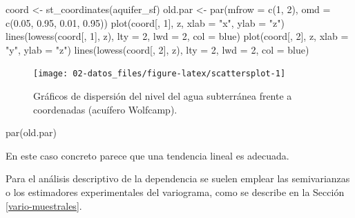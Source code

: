 \documentclass[
  spanish,
]{book}
\newenvironment{Shaded}{\begin{snugshade}}{\end{snugshade}}
\newcommand{\AttributeTok}[1]{\textcolor[rgb]{0.77,0.63,0.00}{#1}}
\newcommand{\DecValTok}[1]{\textcolor[rgb]{0.00,0.00,0.81}{#1}}
\newcommand{\FloatTok}[1]{\textcolor[rgb]{0.00,0.00,0.81}{#1}}
\newcommand{\FunctionTok}[1]{\textcolor[rgb]{0.00,0.00,0.00}{#1}}
\newcommand{\NormalTok}[1]{#1}
\newcommand{\OtherTok}[1]{\textcolor[rgb]{0.56,0.35,0.01}{#1}}
\newcommand{\StringTok}[1]{\textcolor[rgb]{0.31,0.60,0.02}{#1}}
\theoremstyle{break}
\begin{document}
\begin{Shaded}
\begin{Highlighting}[]
\NormalTok{coord }\OtherTok{\textless{}{-}} \FunctionTok{st\_coordinates}\NormalTok{(aquifer\_sf)}
\NormalTok{old.par }\OtherTok{\textless{}{-}} \FunctionTok{par}\NormalTok{(}\AttributeTok{mfrow =} \FunctionTok{c}\NormalTok{(}\DecValTok{1}\NormalTok{, }\DecValTok{2}\NormalTok{), }\AttributeTok{omd =} \FunctionTok{c}\NormalTok{(}\FloatTok{0.05}\NormalTok{, }\FloatTok{0.95}\NormalTok{, }\FloatTok{0.01}\NormalTok{, }\FloatTok{0.95}\NormalTok{))}
\FunctionTok{plot}\NormalTok{(coord[, }\DecValTok{1}\NormalTok{], z, }\AttributeTok{xlab =} \StringTok{"x"}\NormalTok{, }\AttributeTok{ylab =} \StringTok{"z"}\NormalTok{)}
\FunctionTok{lines}\NormalTok{(}\FunctionTok{lowess}\NormalTok{(coord[, }\DecValTok{1}\NormalTok{], z), }\AttributeTok{lty =} \DecValTok{2}\NormalTok{, }\AttributeTok{lwd =} \DecValTok{2}\NormalTok{, }\AttributeTok{col =} \StringTok{\textquotesingle{}blue\textquotesingle{}}\NormalTok{)}
\FunctionTok{plot}\NormalTok{(coord[, }\DecValTok{2}\NormalTok{], z, }\AttributeTok{xlab =} \StringTok{"y"}\NormalTok{, }\AttributeTok{ylab =} \StringTok{"z"}\NormalTok{)}
\FunctionTok{lines}\NormalTok{(}\FunctionTok{lowess}\NormalTok{(coord[, }\DecValTok{2}\NormalTok{], z), }\AttributeTok{lty =} \DecValTok{2}\NormalTok{, }\AttributeTok{lwd =} \DecValTok{2}\NormalTok{, }\AttributeTok{col =} \StringTok{\textquotesingle{}blue\textquotesingle{}}\NormalTok{)}
\end{Highlighting}
\end{Shaded}

\begin{figure}[!htb]

{\centering \texttt{[image: 02-datos\_files/figure-latex/scattersplot-1]} 

}

\caption{Gráficos de dispersión del nivel del agua subterránea frente a coordenadas (acuífero Wolfcamp).}\label{fig:scattersplot}
\end{figure}

\begin{Shaded}
\begin{Highlighting}[]
\FunctionTok{par}\NormalTok{(old.par)}
\end{Highlighting}
\end{Shaded}

En este caso concreto parece que una tendencia lineal es adecuada.

Para el análisis descriptivo de la dependencia se suelen emplear las semivarianzas o los estimadores experimentales del variograma, como se describe en la Sección \ref{vario-muestrales}.
\end{document}
